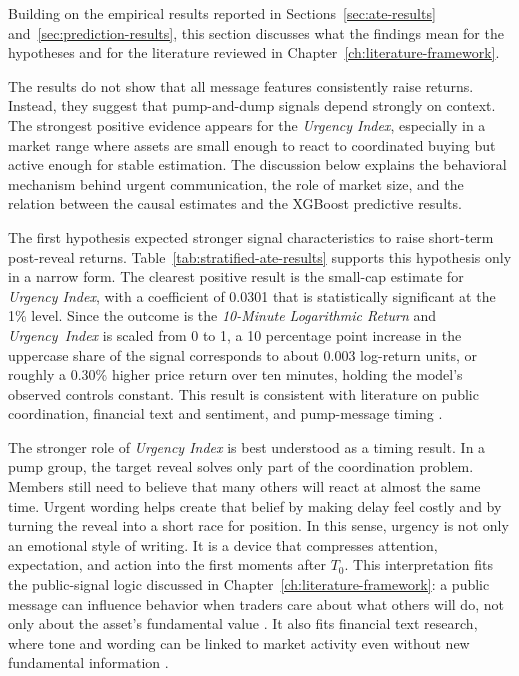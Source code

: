Building on the empirical results reported in Sections~\ref{sec:ate-results} and~\ref{sec:prediction-results}, this section discusses what the findings mean for the hypotheses and for the literature reviewed in Chapter~\ref{ch:literature-framework}. 

The results do not show that all message features consistently raise returns. Instead, they suggest that pump-and-dump signals depend strongly on context. The strongest positive evidence appears for the \textit{Urgency Index}, especially in a market range where assets are small enough to react to coordinated buying but active enough for stable estimation. The discussion below explains the behavioral mechanism behind urgent communication, the role of market size, and the relation between the causal estimates and the XGBoost predictive results.

The first hypothesis expected stronger signal characteristics to raise short-term post-reveal returns. Table~\ref{tab:stratified-ate-results} supports this hypothesis only in a narrow form. The clearest positive result is the small-cap estimate for \textit{Urgency Index}, with a coefficient of 0.0301 that is statistically significant at the 1\% level. Since the outcome is the \textit{10-Minute Logarithmic Return} and \textit{Urgency~Index} is scaled from 0 to 1, a 10 percentage point increase in the uppercase share of the signal corresponds to about 0.003 log-return units, or roughly a 0.30\% higher price return over ten minutes, holding the model's observed controls constant. This result is consistent with literature on public coordination, financial text and sentiment, and pump-message timing \cite{morris2002social, tetlock2007giving, xu2019anatomy, lamorgia2023doge}.

The stronger role of \textit{Urgency Index} is best understood as a timing result. In a pump group, the target reveal solves only part of the coordination problem. Members still need to believe that many others will react at almost the same time. Urgent wording helps create that belief by making delay feel costly and by turning the reveal into a short race for position. In this sense, urgency is not only an emotional style of writing. It is a device that compresses attention, expectation, and action into the first moments after $T_0$. This interpretation fits the public-signal logic discussed in Chapter~\ref{ch:literature-framework}: a public message can influence behavior when traders care about what others will do, not only about the asset's fundamental value \cite{morris2002social}. It also fits financial text research, where tone and wording can be linked to market activity even without new fundamental information \cite{tetlock2007giving}.

